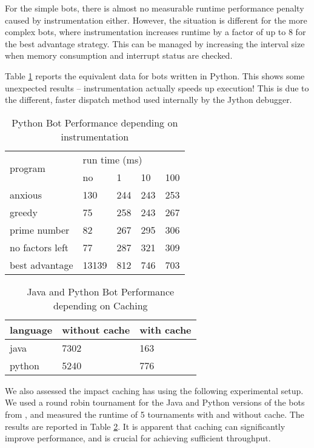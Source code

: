 For the simple bots, there is almost no measurable runtime performance penalty caused by instrumentation either. However, the situation is different for the more complex bots, where instrumentation increases runtime by a factor of up to 8 for the best advantage strategy. This can be managed by increasing the interval size when memory consumption and interrupt status are checked.

Table \ref{tab:performance:python} reports the equivalent data for bots written in Python. This shows some unexpected results -- instrumentation actually speeds up execution! This is due to the different, faster dispatch method used internally by the Jython debugger. 

\begin{table}[h]
	\centering
	\caption{Python Bot Performance depending on instrumentation}
	\label{tab:performance:python}
	\begin{tabular}{|l|l|l|l|l|}
		\hline
		\multirow{2}{*}{program}  & \multicolumn{4}{l|}{run time (ms)} \\ \cline{2-5} 
								 & no   & 1    & 10    &  100    \\ \hline
		anxious                  & 130  & 244  & 243   & 253          \\ \hline
		greedy                   & 75   & 258  & 243   & 267          \\ \hline
		prime number             & 82   & 267  & 295   & 306          \\ \hline
		no factors left          & 77   & 287  & 321   & 309          \\ \hline
		best advantage           & 13139& 812  & 746   & 703          \\ \hline
	\end{tabular}
\end{table}



\begin{table}[h]
	\centering
	\caption{Java and Python Bot Performance depending on Caching}
	\label{tab:performance:cache}
	\begin{tabular}{|l|l|l|}
		\hline
		language    & without cache    & with cache   \\ \hline
		java        & 7302             & 163          \\ \hline
		python      & 5240             & 776          \\ \hline
	\end{tabular}
\end{table}

We also assessed the impact caching has using the following experimental setup.  We used a round robin tournament for the Java and Python versions of the bots from \cite{meyer2010primegame}, and measured the runtime of 5 tournaments with and without cache. The results are reported in Table \ref{tab:performance:cache}. It is apparent that caching can significantly improve performance, and is crucial for achieving sufficient throughput.  





